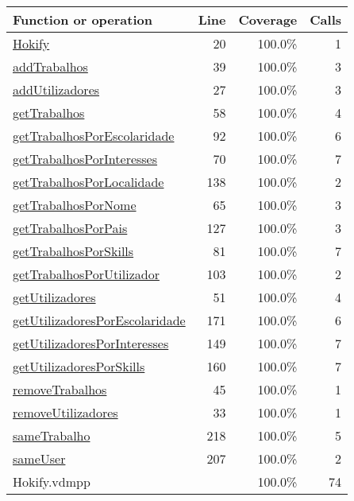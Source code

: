 \begin{longtable}{|l|r|r|r|}
\hline
Function or operation & Line & Coverage & Calls \\
\hline
\hline
\hyperref[Hokify:20]{Hokify} & 20&100.0\% & 1 \\
\hline
\hyperref[addTrabalhos:39]{addTrabalhos} & 39&100.0\% & 3 \\
\hline
\hyperref[addUtilizadores:27]{addUtilizadores} & 27&100.0\% & 3 \\
\hline
\hyperref[getTrabalhos:58]{getTrabalhos} & 58&100.0\% & 4 \\
\hline
\hyperref[getTrabalhosPorEscolaridade:92]{getTrabalhosPorEscolaridade} & 92&100.0\% & 6 \\
\hline
\hyperref[getTrabalhosPorInteresses:70]{getTrabalhosPorInteresses} & 70&100.0\% & 7 \\
\hline
\hyperref[getTrabalhosPorLocalidade:138]{getTrabalhosPorLocalidade} & 138&100.0\% & 2 \\
\hline
\hyperref[getTrabalhosPorNome:65]{getTrabalhosPorNome} & 65&100.0\% & 3 \\
\hline
\hyperref[getTrabalhosPorPais:127]{getTrabalhosPorPais} & 127&100.0\% & 3 \\
\hline
\hyperref[getTrabalhosPorSkills:81]{getTrabalhosPorSkills} & 81&100.0\% & 7 \\
\hline
\hyperref[getTrabalhosPorUtilizador:103]{getTrabalhosPorUtilizador} & 103&100.0\% & 2 \\
\hline
\hyperref[getUtilizadores:51]{getUtilizadores} & 51&100.0\% & 4 \\
\hline
\hyperref[getUtilizadoresPorEscolaridade:171]{getUtilizadoresPorEscolaridade} & 171&100.0\% & 6 \\
\hline
\hyperref[getUtilizadoresPorInteresses:149]{getUtilizadoresPorInteresses} & 149&100.0\% & 7 \\
\hline
\hyperref[getUtilizadoresPorSkills:160]{getUtilizadoresPorSkills} & 160&100.0\% & 7 \\
\hline
\hyperref[removeTrabalhos:45]{removeTrabalhos} & 45&100.0\% & 1 \\
\hline
\hyperref[removeUtilizadores:33]{removeUtilizadores} & 33&100.0\% & 1 \\
\hline
\hyperref[sameTrabalho:218]{sameTrabalho} & 218&100.0\% & 5 \\
\hline
\hyperref[sameUser:207]{sameUser} & 207&100.0\% & 2 \\
\hline
\hline
Hokify.vdmpp & & 100.0\% & 74 \\
\hline
\end{longtable}

